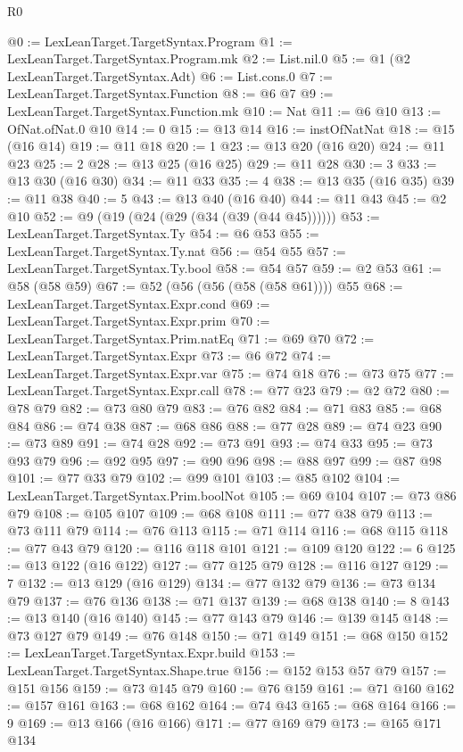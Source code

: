 \begin{lexlean}{R0}
\begin{coremodule}
@0 := LexLeanTarget.TargetSyntax.Program
@1 := LexLeanTarget.TargetSyntax.Program.mk
@2 := List.nil.{0}
@5 := @1 (@2 LexLeanTarget.TargetSyntax.Adt)
@6 := List.cons.{0}
@7 := LexLeanTarget.TargetSyntax.Function
@8 := @6 @7
@9 := LexLeanTarget.TargetSyntax.Function.mk
@10 := Nat
@11 := @6 @10
@13 := OfNat.ofNat.{0} @10
@14 := 0
@15 := @13 @14
@16 := instOfNatNat
@18 := @15 (@16 @14)
@19 := @11 @18
@20 := 1
@23 := @13 @20 (@16 @20)
@24 := @11 @23
@25 := 2
@28 := @13 @25 (@16 @25)
@29 := @11 @28
@30 := 3
@33 := @13 @30 (@16 @30)
@34 := @11 @33
@35 := 4
@38 := @13 @35 (@16 @35)
@39 := @11 @38
@40 := 5
@43 := @13 @40 (@16 @40)
@44 := @11 @43
@45 := @2 @10
@52 := @9 (@19 (@24 (@29 (@34 (@39 (@44 @45))))))
@53 := LexLeanTarget.TargetSyntax.Ty
@54 := @6 @53
@55 := LexLeanTarget.TargetSyntax.Ty.nat
@56 := @54 @55
@57 := LexLeanTarget.TargetSyntax.Ty.bool
@58 := @54 @57
@59 := @2 @53
@61 := @58 (@58 @59)
@67 := @52 (@56 (@56 (@58 (@58 @61)))) @55
@68 := LexLeanTarget.TargetSyntax.Expr.cond
@69 := LexLeanTarget.TargetSyntax.Expr.prim
@70 := LexLeanTarget.TargetSyntax.Prim.natEq
@71 := @69 @70
@72 := LexLeanTarget.TargetSyntax.Expr
@73 := @6 @72
@74 := LexLeanTarget.TargetSyntax.Expr.var
@75 := @74 @18
@76 := @73 @75
@77 := LexLeanTarget.TargetSyntax.Expr.call
@78 := @77 @23
@79 := @2 @72
@80 := @78 @79
@82 := @73 @80 @79
@83 := @76 @82
@84 := @71 @83
@85 := @68 @84
@86 := @74 @38
@87 := @68 @86
@88 := @77 @28
@89 := @74 @23
@90 := @73 @89
@91 := @74 @28
@92 := @73 @91
@93 := @74 @33
@95 := @73 @93 @79
@96 := @92 @95
@97 := @90 @96
@98 := @88 @97
@99 := @87 @98
@101 := @77 @33 @79
@102 := @99 @101
@103 := @85 @102
@104 := LexLeanTarget.TargetSyntax.Prim.boolNot
@105 := @69 @104
@107 := @73 @86 @79
@108 := @105 @107
@109 := @68 @108
@111 := @77 @38 @79
@113 := @73 @111 @79
@114 := @76 @113
@115 := @71 @114
@116 := @68 @115
@118 := @77 @43 @79
@120 := @116 @118 @101
@121 := @109 @120
@122 := 6
@125 := @13 @122 (@16 @122)
@127 := @77 @125 @79
@128 := @116 @127
@129 := 7
@132 := @13 @129 (@16 @129)
@134 := @77 @132 @79
@136 := @73 @134 @79
@137 := @76 @136
@138 := @71 @137
@139 := @68 @138
@140 := 8
@143 := @13 @140 (@16 @140)
@145 := @77 @143 @79
@146 := @139 @145
@148 := @73 @127 @79
@149 := @76 @148
@150 := @71 @149
@151 := @68 @150
@152 := LexLeanTarget.TargetSyntax.Expr.build
@153 := LexLeanTarget.TargetSyntax.Shape.true
@156 := @152 @153 @57 @79
@157 := @151 @156
@159 := @73 @145 @79
@160 := @76 @159
@161 := @71 @160
@162 := @157 @161
@163 := @68 @162
@164 := @74 @43
@165 := @68 @164
@166 := 9
@169 := @13 @166 (@16 @166)
@171 := @77 @169 @79
@173 := @165 @171 @134

\end{coremodule}
\end{lexlean}
